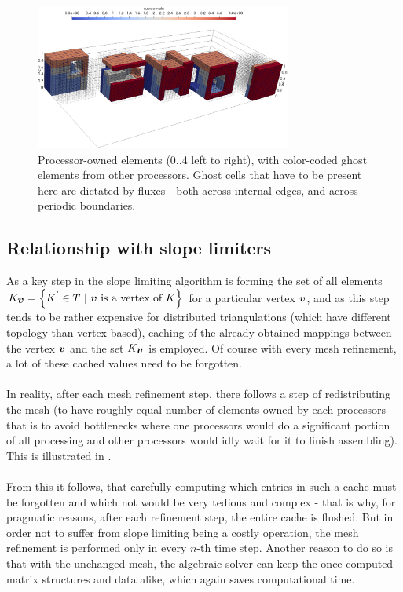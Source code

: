 \begin{figure}[H]
		\begin{center}
			\includegraphics[width=0.75\textwidth]{img/mesh/cube-periodic,ghost.jpg}
			\vspace{-2mm}
		\caption{Processor-owned elements (0..4 left to right), with color-coded ghost elements from other processors. Ghost cells that have to be present here are dictated by fluxes - both across internal edges, and across periodic boundaries.}
		\label{figure:ghostPer}
		\end{center}
	\end{figure}\vspace{-5mm}

\subsection{Relationship with slope limiters}
As a key step in the slope limiting algorithm  is forming the set of all elements $K_{\bfv} = \left\{K^{'}\in T\ |\ \bfv \text{ is a vertex of } K\right\}$ for a particular vertex $\mbox{\boldmath $v$}$, and as this step tends to be rather expensive for distributed triangulations (which have different topology than vertex-based), caching of the already obtained mappings between the vertex $\mbox{\boldmath $v$}$ and the set $K_{\mbox{\boldmath $v$}}$ is employed. Of course with every mesh refinement, a lot of these cached values need to be forgotten.
\paragraph{}
In reality, after each mesh refinement step, there follows a step of redistributing the mesh (to have roughly equal number of elements owned by each processors - that is to avoid bottlenecks where one processors would do a significant portion of all processing and other processors would idly wait for it to finish assembling). This is illustrated in .
\paragraph{}
From this it follows, that carefully computing which entries in such a cache must be forgotten and which not would be very tedious and complex - that is why, for pragmatic reasons, after each refinement step, the entire cache is flushed. But in order not to suffer from slope limiting being a costly operation, the mesh refinement is performed only in every $n$-th time step. Another reason to do so is that with the unchanged mesh, the algebraic solver can keep the once computed matrix structures and data alike, which again saves computational time.